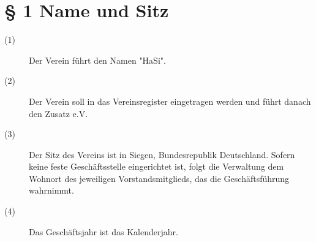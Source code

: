 \documentclass[a4paper,12pt]{scrartcl}
\begin{document}
\newpage

\tableofcontents
\thispagestyle{empty}
\clearpage



\renewcommand{\sectionmark}[1]{\markright{#1}}
\renewcommand{\subsectionmark}[1]{}
\renewcommand{\subsubsectionmark}[1]{}
\rhead{\today}

\onehalfspacing
\renewcommand{\thesection}{\arabic{section}}
\renewcommand{\thesection}{\arabic{section}}
\setcounter{section}{0}
\setcounter{page}{1}


\section*{\S{} 1 Name und Sitz}
\begin{description} 

\item[(1)] Der Verein führt den Namen "HaSi".
\item[(2)] Der Verein soll in das Vereinsregister eingetragen werden und führt danach den Zusatz e.V.
\item[(3)] Der Sitz des Vereins ist in Siegen, Bundesrepublik Deutschland. Sofern keine feste Geschäftsstelle eingerichtet ist, folgt die Verwaltung dem Wohnort des jeweiligen Vorstandsmitglieds, das die Geschäftsführung wahrnimmt. 
\item[(4)] Das Geschäftsjahr ist das Kalenderjahr.

\end{description}
\end{document}
